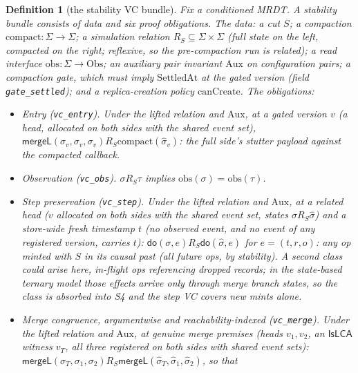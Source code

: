\documentclass[11pt]{article}
\newtheorem{definition}[theorem]{Definition}
\newcommand{\mergeL}{\mathsf{mergeL}}
\newcommand{\lean}[1]{\texttt{#1}}
\newcommand{\dodo}{\mathsf{do}}
\begin{document}
\begin{definition}[the stability VC bundle]
\label{def:stabvc}
Fix a conditioned MRDT. A stability bundle consists of data and six
proof obligations. The data: a cut $S$; a compaction
$\mathrm{compact} : \Sigma \to \Sigma$; a
simulation relation $R_S \subseteq \Sigma \times \Sigma$ (full state on
the left, compacted on the right; reflexive, so the pre-compaction run
is related); a read interface $\mathrm{obs} : \Sigma \to \mathrm{Obs}$;
an auxiliary pair invariant $\mathrm{Aux}$ on configuration pairs; a
compaction gate, which must imply $\mathrm{SettledAt}$ at the gated
version (field \lean{gate\_settled}); and a replica-creation policy
$\mathrm{canCreate}$. The obligations:
\begin{itemize}[leftmargin=2.4em]
\item[\textbf{S1}] \emph{Entry} (\lean{vc\_entry}). Under the lifted
  relation and $\mathrm{Aux}$, at a gated version $v$ (a head, allocated
  on both sides with the shared event set),
  $\mergeL(\sigma_v, \sigma_v, \sigma_v) \mathrel{R_S}
  \mathrm{compact}(\hat{\sigma}_v)$: the full side's stutter payload
  against the compacted callback.
\item[\textbf{S2}] \emph{Observation} (\lean{vc\_obs}).
  $\sigma \mathrel{R_S} \tau$
  implies $\mathrm{obs}(\sigma) = \mathrm{obs}(\tau)$.
\item[\textbf{S3}] \emph{Step preservation} (\lean{vc\_step}). Under
  the lifted relation and $\mathrm{Aux}$, at a related head ($v$
  allocated on both sides with the shared event set, states
  $\sigma \mathrel{R_S} \hat{\sigma}$) and a \emph{store-wide fresh}
  timestamp $t$ (no observed event, and no event of any registered
  version, carries $t$):
  $\dodo(\sigma, e) \mathrel{R_S} \dodo(\hat{\sigma}, e)$ for
  $e = (t, r, o)$: any op minted with $S$ in its causal past (all
  future ops, by stability). A second class could arise here,
  in-flight ops referencing dropped records; in the state-based ternary
  model those effects arrive only through merge branch states, so the
  class is absorbed into S4 and the step VC covers new mints alone.
\item[\textbf{S4}] \emph{Merge congruence, argumentwise and
  reachability-indexed} (\lean{vc\_merge}). Under the lifted relation
  and $\mathrm{Aux}$, at \emph{genuine merge premises} (heads
  $v_1, v_2$, an $\mathsf{IsLCA}$ witness $v_T$, all three registered
  on both sides with shared event sets):
  $\mergeL(\sigma_T, \sigma_1, \sigma_2) \mathrel{R_S}
  \mergeL(\hat{\sigma}_T, \hat{\sigma}_1, \hat{\sigma}_2)$, so that

\end{itemize}
\end{definition}
\end{document}
